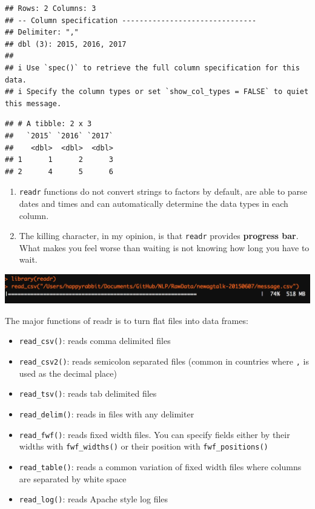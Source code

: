 \documentclass[
  12pt,
]{krantz}
\providecommand{\tightlist}{%
  \setlength{\itemsep}{0pt}\setlength{\parskip}{0pt}}
\begin{document}
\begin{verbatim}
## Rows: 2 Columns: 3
## -- Column specification -------------------------------
## Delimiter: ","
## dbl (3): 2015, 2016, 2017
## 
## i Use `spec()` to retrieve the full column specification for this data.
## i Specify the column types or set `show_col_types = FALSE` to quiet this message.
\end{verbatim}

\begin{verbatim}
## # A tibble: 2 x 3
##   `2015` `2016` `2017`
##    <dbl>  <dbl>  <dbl>
## 1      1      2      3
## 2      4      5      6
\end{verbatim}

\begin{enumerate}
\def\labelenumi{\arabic{enumi}.}
\item
  \texttt{readr} functions do not convert strings to factors by default, are able to parse dates and times and can automatically determine the data types in each column.
\item
  The killing character, in my opinion, is that \texttt{readr} provides \textbf{progress bar}. What makes you feel worse than waiting is not knowing how long you have to wait.
\end{enumerate}

\includegraphics{images/prograssbar.png}

The major functions of readr is to turn flat files into data frames:

\begin{itemize}
\tightlist
\item
  \texttt{read\_csv()}: reads comma delimited files
\item
  \texttt{read\_csv2()}: reads semicolon separated files (common in countries where \texttt{,} is used as the decimal place)
\item
  \texttt{read\_tsv()}: reads tab delimited files
\item
  \texttt{read\_delim()}: reads in files with any delimiter
\item
  \texttt{read\_fwf()}: reads fixed width files. You can specify fields either by their widths with \texttt{fwf\_widths()} or their position with \texttt{fwf\_positions()}\\
\item
  \texttt{read\_table()}: reads a common variation of fixed width files where columns are separated by white space
\item
  \texttt{read\_log()}: reads Apache style log files
\end{itemize}
\end{document}

